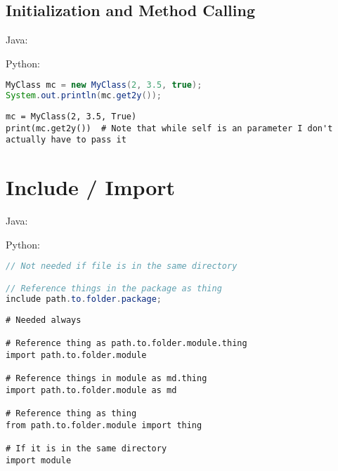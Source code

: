 \documentclass{article}
\begin{document}
\subsection{Initialization and Method Calling}
\begin{minipage}{0.45\linewidth}
    Java:
\end{minipage}
\hfill
\begin{minipage}{0.45\linewidth}
    Python:
\end{minipage}

\begin{minipage}{0.45\linewidth}
    \begin{lstlisting}[language=Java]
MyClass mc = new MyClass(2, 3.5, true);
System.out.println(mc.get2y());
     \end{lstlisting}
\end{minipage}
\hfill
\begin{minipage}{0.45\linewidth}
    \begin{lstlisting}
mc = MyClass(2, 3.5, True)
print(mc.get2y())  # Note that while self is an parameter I don't actually have to pass it
    \end{lstlisting}
\end{minipage}

\section{Include / Import}
\begin{minipage}{0.45\linewidth}
    Java:
\end{minipage}
\hfill
\begin{minipage}{0.45\linewidth}
    Python:
\end{minipage}

\begin{minipage}{0.45\linewidth}
    \begin{lstlisting}[language=Java]
// Not needed if file is in the same directory

// Reference things in the package as thing
include path.to.folder.package;
    \end{lstlisting}
\end{minipage}
\hfill
\begin{minipage}{0.45\linewidth}
    \begin{lstlisting}
# Needed always

# Reference thing as path.to.folder.module.thing
import path.to.folder.module

# Reference things in module as md.thing
import path.to.folder.module as md

# Reference thing as thing
from path.to.folder.module import thing

# If it is in the same directory
import module
    \end{lstlisting}
\end{minipage}
\end{document}
